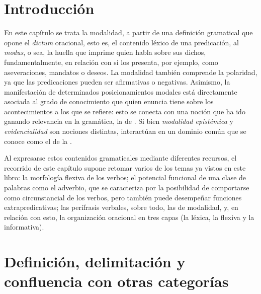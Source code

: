 
\section{Introducción}

En este capítulo se trata la modalidad, a partir de una definición gramatical
que opone el \textit{dictum} oracional, esto es, el contenido léxico de una
predicación, al \textit{modus}, o sea, la huella que imprime quien habla sobre
sus dichos, fundamentalmente, en relación con si los presenta, por ejemplo, como
aseveraciones, mandatos o deseos. La modalidad también comprende la polaridad,
ya que las predicaciones pueden ser afirmativas o negativas. Asimismo, la
manifestación de determinados posicionamientos modales está directamente
asociada al grado de conocimiento que quien enuncia tiene sobre los
acontecimientos a los que se refiere: esto se conecta con una noción que ha ido
ganando relevancia en la gramática, la de . Si bien
\textit{modalidad epistémica} y \textit{evidencialidad} son nociones distintas,
interactúan en un dominio común que se conoce como el de la
.

Al expresarse estos contenidos gramaticales mediante diferentes recursos, el
recorrido de este capítulo supone retomar varios de los temas ya vistos en este
libro: la morfología flexiva de los verbos; el potencial funcional de una clase
de palabras como el adverbio, que se caracteriza por la posibilidad de
comportarse como circunstancial de los verbos, pero también puede desempeñar
funciones extrapredicativas; las perífrasis verbales, sobre todo, las de
modalidad, y, en relación con esto, la organización oracional en tres capas (la
léxica, la flexiva y la informativa).

\section{Definición, delimitación y confluencia con otras categorías}\label{sec:14-definicion}


